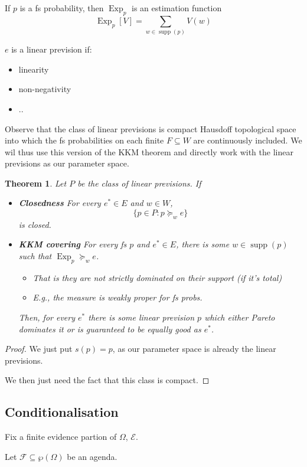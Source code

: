 \documentclass[11pt]{article}
\newtheorem{theorem}{Theorem}[section]
\theoremstyle{definition}
\theoremstyle{remark}
\newcommand{\agenda}{\mathcal F}
\newcommand{\supp}{\operatorname{supp}}
\newcommand{\Exp}{\operatorname{Exp}}
\begin{document}
If $p$ is a fs probability, then $\Exp_p$ is an estimation function \[\Exp_p[V]=\sum_{w\in\supp(p)}V(w)\]

$e$ is a linear prevision if: 
\begin{itemize}
	\item linearity
	\item non-negativity
	\item ..
\end{itemize}

Observe that the class of linear previsions is compact Hausdoff topological space into which the fs probabilities on each finite $F\subseteq W$ are continuously included. We wil thus use this version of the KKM theorem and directly work with the linear previsions as our parameter space. 

\begin{theorem}
	Let $P$ be the class of linear previsions. 
	If 
	\begin{itemize}
		\item \textbf{Closedness} 
		For every $e^*\in E$ and $w\in W$, \[\{p\in P: p\succeq_w e\}\] is closed.
		\item \textbf{KKM covering} For every fs $p$ and $e^*\in E$, there is some $w\in\supp(p)$ such that $\Exp_p\succeq_w e$. 
		\begin{itemize}
			\item That is they are not strictly dominated on their support (if it's total)
			\item E.g., the measure is weakly proper for fs probs. 
		\end{itemize}
		Then, for every $e^*$ there is some linear prevision $p$ which either Pareto dominates it or is guaranteed to be equally good as $e^*$. 
	\end{itemize}
\end{theorem}
\begin{proof}
	We just put $s(p)=p$, as our parameter space is already the linear previsions. 
	
	We then just need the fact that this class is compact. 
\end{proof}




\subsection{Conditionalisation}

Fix a finite evidence partion of $\Omega$, $\mathcal{E}$. 

Let $\agenda\subseteq\wp(\Omega)$ be an agenda.
\end{document}
